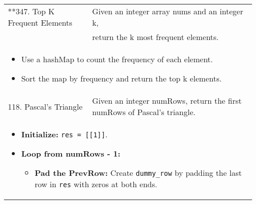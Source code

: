 \begin{summary}
\begin{center}
\begin{tabular}{ll}
            \midrule
            **347. Top K Frequent Elements & Given an integer array nums and an integer k, \\
            & return the k most frequent elements. \\
            \multicolumn{2}{p{\linewidth}}{
                \begin{itemize}
                    \item Use a hashMap to count the frequency of each element.
                    \item Sort the map by frequency and return the top k elements.
                \end{itemize}
            } \\
            \midrule
            118. Pascal's Triangle & Given an integer numRows, return the first numRows of Pascal's triangle. \\
            \multicolumn{2}{p{\linewidth}}{
                \begin{itemize}
                    \item \textbf{Initialize:} \texttt{res = [[1]]}.
                    \item \textbf{Loop from numRows - 1:}
                    \begin{itemize}
                        \item \textbf{Pad the PrevRow:} Create \texttt{dummy\_row} by padding the last row in \texttt{res} with zeros at both ends. 

\end{itemize}
\end{itemize}}
\end{tabular}
\end{center}
\end{summary}
